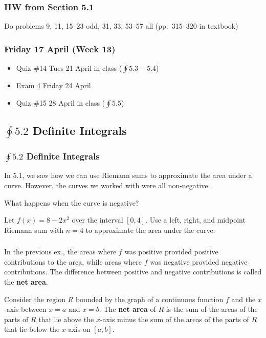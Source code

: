 \documentclass[14pt]{beamer}
\begin{document}
\begin{frame}
\frametitle{HW from Section 5.1}
Do problems 9, 11, 15--23 odd, 31, 33, 53--57 all (pp.\ 315--320 in textbook)
\end{frame}


\begin{frame}
\frametitle{Friday 17 April (Week 13)}
\small
\begin{itemize}
\item Quiz \#14 Tues 21 April in class ($\oint 5.3-5.4$)
\item Exam 4 Friday 24 April
\item Quiz \#15 28 April in class ($\oint 5.5$)
\end{itemize}
\end{frame}

\begin{frame}
\subsection[$\oint 5.2$ Definite Integrals]{$\oint 5.2$ Definite Integrals}
\frametitle{$\oint 5.2$ Definite Integrals}
\small
In 5.1, we saw how we can use Riemann sums to approximate the area under a curve.  However, the curves we worked with were all non-negative.

\vspace{1pc}
What happens when the curve is negative?
\begin{ex} Let $f(x)=8-2x^2$ over the interval $[0,4]$.  Use a left, right, and midpoint Riemann sum with $n=4$ to approximate the area under the curve. \end{ex}
\end{frame}

\begin{frame}
\frametitle{}
\footnotesize
In the previous ex., the areas where $f$ was positive provided positive contributions to the area, while areas where $f$ was negative provided negative contributions.  The difference between positive and negative contributions is called the {\bf net area}.

\vspace{1pc}
\begin{dfn} Consider the region $R$ bounded by the graph of a continuous function $f$ and the $x$-axis between $x=a$ and $x=b$.  The {\bf net area} of $R$ is the sum of the areas of the parts of $R$ that lie above the $x$-axis minus the sum of the areas of the parts of $R$ that lie below the $x$-axis on $[a,b]$. \end{dfn}
\end{frame}
\end{document}
